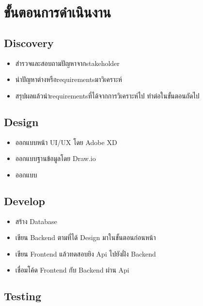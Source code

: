 \section{ขั้นตอนการดำเนินงาน}
\subsection{Discovery}
\begin{itemize}
  \item สำรวจและสอบถามปัญหาจากstakeholder
  \item นำปัญหาต่างหรือrequirementsมาวิเคราะห์
  \item สรุปผลแล้วนำrequirementsที่ได้จากการวิเคราะห์ไป  ทำต่อในขั้นตอนถัดไป
\end{itemize}
\subsection{Design}
\begin{itemize}
  \item ออกแบบหน้า UI/UX โดย Adobe XD
  \item ออกแบบฐานข้อมูลโดย Draw.io
  \item ออกแบบ
\end{itemize}
\subsection{Develop}
\begin{itemize}
  \item สร้าง Database
  \item เขียน Backend ตามที่ได้ Design มาในขั้นตอนก่อนหน้า
  \item เขียน Frontend แล้วทดสอบยิง Api ไปยังฝั่ง Backend
  \item เชื่อมโค้ด Frontend กับ Backend ผ่าน Api
\end{itemize}
\subsection{Testing}
